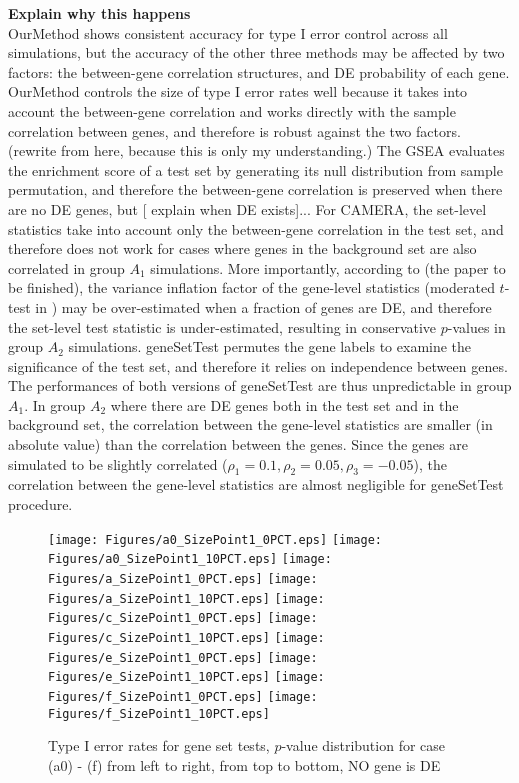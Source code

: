 \documentclass[11pt, a4paper]{article}
\begin{document}
		 
		 \textbf{Explain why this happens}\\
		OurMethod shows consistent accuracy for type I error control across all simulations, but the accuracy of the other three methods may be affected by two factors: the between-gene correlation structures, and DE probability of each gene. OurMethod controls the size of type I error rates well because it takes into account the between-gene correlation and works directly with the sample correlation between genes, and therefore is robust against the two factors. (rewrite from here, because this is only my understanding.)  The GSEA evaluates the enrichment score of a test set by generating its null distribution from sample permutation, and therefore the between-gene correlation is preserved when there are no DE genes, but [ explain when DE exists]... 
		For CAMERA, the set-level statistics take into account only the between-gene correlation in the test set, and therefore does not work for cases where genes in the background set are also correlated in group $A_1$ simulations. More importantly, according to (the paper to be finished), the variance inflation factor of the gene-level statistics (moderated $t$-test in \cite{wu2012camera}) may be over-estimated when a fraction of genes are DE, and therefore the set-level test statistic is under-estimated, resulting in conservative $p$-values in group $A_2$ simulations. geneSetTest permutes the gene labels to examine the significance of the test set, and therefore it relies on independence between genes. The performances of both versions of geneSetTest are thus unpredictable in group $A_1$. In group $A_2$ where there are DE genes both in the test set and in the background set, the correlation between the gene-level statistics are smaller (in absolute value) than the correlation between the genes. Since the genes are simulated to be slightly correlated ($\rho_1=0.1, \rho_2 = 0.05, \rho_3 = -0.05$), the correlation between the gene-level statistics are almost negligible for geneSetTest procedure. 
			

		\begin{figure}[H]
			\caption{Type I error rates for gene set tests, $p$-value distribution for case (a0) - (f) from left to right, from top to bottom, NO gene is DE}\label{fig:typeIerror}
	 \begin{center}
		\texttt{[image: Figures/a0\_SizePoint1\_0PCT.eps]}
		\texttt{[image: Figures/a0\_SizePoint1\_10PCT.eps]}
		\texttt{[image: Figures/a\_SizePoint1\_0PCT.eps]}
		\texttt{[image: Figures/a\_SizePoint1\_10PCT.eps]}
		\texttt{[image: Figures/c\_SizePoint1\_0PCT.eps]}
		\texttt{[image: Figures/c\_SizePoint1\_10PCT.eps]}
		\texttt{[image: Figures/e\_SizePoint1\_0PCT.eps]}
		\texttt{[image: Figures/e\_SizePoint1\_10PCT.eps]}
		\texttt{[image: Figures/f\_SizePoint1\_0PCT.eps]}
		\texttt{[image: Figures/f\_SizePoint1\_10PCT.eps]}
			\end{center} 
		\end{figure} 
		
\end{document}
